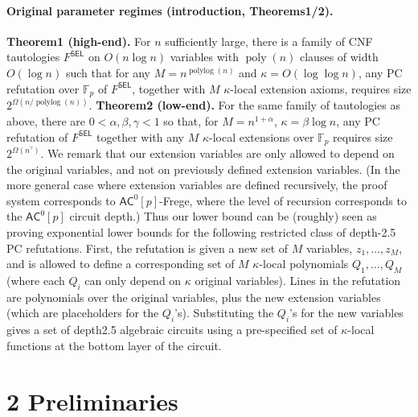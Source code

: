 \documentclass[10pt,a4paper]{article}
\begin{document}
\paragraph{Original parameter regimes (introduction, Theorems1/2).}
\textbf{Theorem1 (high-end).} For $n$ sufficiently large, there is a family of CNF tautologies $F^{\mathsf{SEL}}$ on $O(n\log n)$ variables with $\operatorname{poly}(n)$ clauses of width $O(\log n)$ such that for any $M=n^{\operatorname{polylog}(n)}$ and $\kappa=O(\log\log n)$, any PC refutation over $\mathbb F_p$ of $F^{\mathsf{SEL}}$, together with $M$ $\kappa$-local extension axioms, requires size $2^{\Omega(n/\operatorname{polylog}(n))}$.
\textbf{Theorem2 (low-end).} For the same family of tautologies as above, there are $0<\alpha,\beta,\gamma<1$ so that, for $M=n^{1+\alpha}$, $\kappa=\beta\log n$, any PC refutation of $F^{\mathsf{SEL}}$ together with any $M$ $\kappa$-local extensions over $\mathbb F_p$ requires size $2^{\Omega(n^{\gamma})}$.
We remark that our extension variables are only allowed to depend on the original variables, and not on previously defined extension variables. (In the more general case where extension variables are defined recursively, the proof system corresponds to $\mathsf{AC}^0[p]$-Frege, where the level of recursion corresponds to the $\mathsf{AC}^0[p]$ circuit depth.) Thus our lower bound can be (roughly) seen as proving exponential lower bounds for the following restricted class of depth-2.5 PC refutations. First, the refutation is given a new set of $M$ variables, $z_1,\ldots,z_M$, and is allowed to define a corresponding set of $M$ $\kappa$-local polynomials $Q_1,\ldots,Q_M$ (where each $Q_i$ can only depend on $\kappa$ original variables). Lines in the refutation are polynomials over the original variables, plus the new extension variables (which are placeholders for the $Q_i$'s). Substituting the $Q_i$'s for the new variables gives a set of depth2.5 algebraic circuits using a pre-specified set of $\kappa$-local functions at the bottom layer of the circuit.

\section*{2 Preliminaries}
\end{document}
